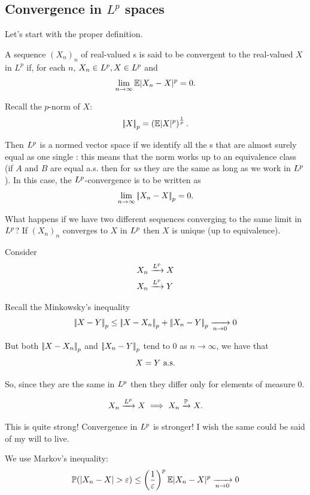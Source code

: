 \documentclass{report}
\begin{document}
\subsection{Convergence in $L^{p}$ spaces}
Let's start with the proper definition.
\begin{definition}
	A sequence ${(X_n)}_{n}$ of real-valued \rv s is said to be convergent to the real-valued \rv{} $X$ in $L^{p}$ if, for each $n$, $X_n\in L^{p},X\in L^{p}$ and
	\[\lim_{n\to\infty}\mathbb{E}|X_n-X|^{p}=0.\]
	\begin{revise}
		Recall the $p$-norm of $X$:
		\[\left|\negthinspace\left|X\right|\negthinspace\right|_{p}=\left(\mathbb{E}|X|^{p}\right)^{\frac{1}{p}}.\]
	\end{revise}
\end{definition}
Then $L^{p}$ is a normed vector space if we identify all the \rv s that are almost surely equal as one single \rv: this means that the norm works up to an equivalence class (if $A$ and $B$ are equal a.s. then for \textit{us} they are the same \rv{} as long as we work in $L^{p}$). In this case, the $L^{p}$-convergence is to be written as
\[
\lim_{n\to\infty}\left|\negthinspace\left|X_n-X\right|\negthinspace\right|_{p}=0.
\]
\begin{remark}
	What happens if we have two different sequences converging to the same limit in $L^{p}$? If ${(X_n)}_{n}$ converges to $X$ in $L^{p}$ then $X$ is unique (up to equivalence).
\end{remark}
\begin{fancyproof}
	Consider
	\begin{align*}
		X_n&\xrightarrow[]{L^{p}} X\\
		X_n&\xrightarrow[]{L^{p}} Y
	\end{align*}
	\begin{revise}
		Recall the Minkowsky's inequality
		\[\left|\negthinspace\left|X-Y\right|\negthinspace\right|_{p}\leq\left|\negthinspace\left|X-X_n\right|\negthinspace\right|_{p}+\left|\negthinspace\left|X_n-Y\right|\negthinspace\right|_{p}\xrightarrow[n\to0]{}0\]
	\end{revise}
	But both $\left|\negthinspace\left|X-X_n\right|\negthinspace\right|_{p}$ and $\left|\negthinspace\left|X_n-Y\right|\negthinspace\right|_{p}$ tend to 0 as $n\to\infty$, we have that
	\[X=Y\text{ a.s.}\]
\end{fancyproof}
So, since they are the same \rv{} in $L^{p}$ then they differ only for elements of measure 0. 
\begin{remark}
	\[ X_n\xrightarrow[]{L^{p}} X\implies X_n\xrightarrow[]{\mathbb{P}} X.\]
\end{remark}
This is quite strong! Convergence in $L^{p}$ is stronger! I wish the same could be said of my will to live.
\begin{fancyproof}
	We use Markov's inequality:
	\[\pr(|X_n-X|>\varepsilon)\leq\left(\dfrac{1}{\varepsilon}\right)^{p}\ev|X_n-X|^{p}\xrightarrow[n\to0]{}0\]
\end{fancyproof}
\end{document}

